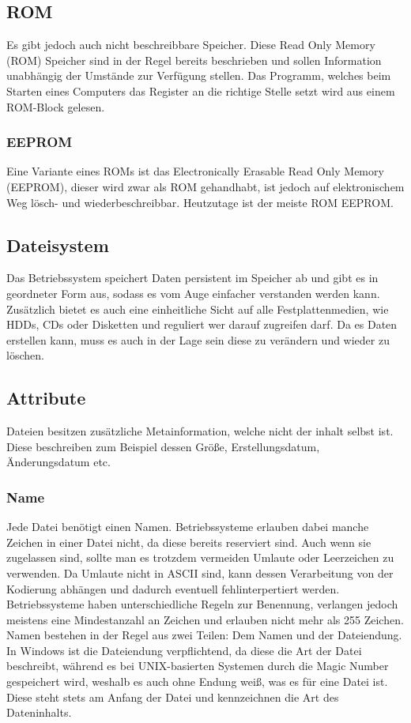 \documentclass{article}
\begin{document}
	\subsection{ROM}
	Es gibt jedoch auch nicht beschreibbare Speicher. Diese Read Only Memory (ROM) Speicher sind in der Regel bereits beschrieben und sollen Information unabhängig der Umstände zur Verfügung stellen. Das Programm, welches beim Starten eines Computers das Register an die richtige Stelle setzt wird aus einem ROM-Block gelesen.
	\subsubsection{EEPROM}
	Eine Variante eines ROMs ist das Electronically Erasable Read Only Memory (EEPROM), dieser wird zwar als ROM gehandhabt, ist jedoch auf elektronischem Weg lösch- und wiederbeschreibbar. Heutzutage ist der meiste ROM EEPROM.
	\subsection{Dateisystem}
	Das Betriebssystem speichert Daten persistent im Speicher ab und gibt es in geordneter Form aus, sodass es vom Auge einfacher verstanden werden kann. Zusätzlich bietet es auch eine einheitliche Sicht auf alle Festplattenmedien, wie HDDs, CDs oder Disketten und reguliert wer darauf zugreifen darf. Da es Daten erstellen kann, muss es auch in der Lage sein diese zu verändern und wieder zu löschen. \\
	\subsection{Attribute}
	Dateien besitzen zusätzliche Metainformation, welche nicht der inhalt selbst ist. Diese beschreiben zum Beispiel dessen Größe, Erstellungsdatum, Änderungsdatum etc.
	\subsubsection{Name}
	Jede Datei benötigt einen Namen. Betriebssysteme erlauben dabei manche Zeichen in einer Datei nicht, da diese bereits reserviert sind. Auch wenn sie zugelassen sind, sollte man es trotzdem vermeiden Umlaute oder Leerzeichen zu verwenden. Da Umlaute nicht in ASCII sind, kann dessen Verarbeitung von der Kodierung abhängen und dadurch eventuell fehlinterpertiert werden. \\
	Betriebssysteme haben unterschiedliche Regeln zur Benennung, verlangen jedoch meistens eine Mindestanzahl an Zeichen und erlauben nicht mehr als 255 Zeichen. \\
	Namen bestehen in der Regel aus zwei Teilen: Dem Namen und der Dateiendung. \\
	In Windows ist die Dateiendung verpflichtend, da diese die Art der Datei beschreibt, während es bei UNIX-basierten Systemen durch die Magic Number gespeichert wird, weshalb es auch ohne Endung weiß, was es für eine Datei ist. Diese steht stets am Anfang der Datei und kennzeichnen die Art des Dateninhalts.\\
\end{document}
